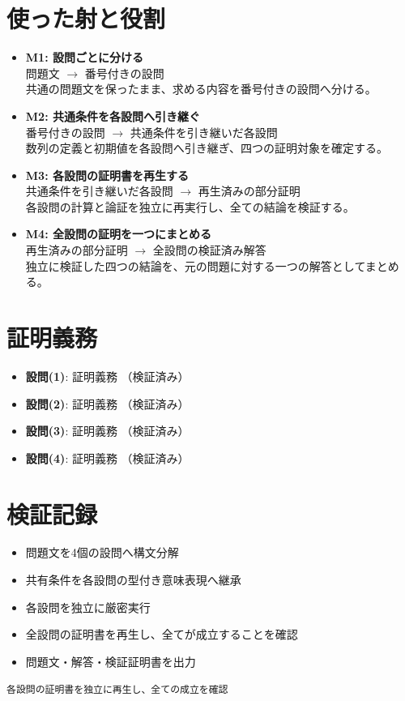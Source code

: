 \documentclass[uplatex,dvipdfmx,11pt]{jsarticle}
\begin{document}
\clearpage
\section*{使った射と役割}
\begin{itemize}
\item \textbf{M1: 設問ごとに分ける}\\
問題文
$\longrightarrow$
番号付きの設問\\
共通の問題文を保ったまま、求める内容を番号付きの設問へ分ける。
\item \textbf{M2: 共通条件を各設問へ引き継ぐ}\\
番号付きの設問
$\longrightarrow$
共通条件を引き継いだ各設問\\
数列の定義と初期値を各設問へ引き継ぎ、四つの証明対象を確定する。
\item \textbf{M3: 各設問の証明書を再生する}\\
共通条件を引き継いだ各設問
$\longrightarrow$
再生済みの部分証明\\
各設問の計算と論証を独立に再実行し、全ての結論を検証する。
\item \textbf{M4: 全設問の証明を一つにまとめる}\\
再生済みの部分証明
$\longrightarrow$
全設問の検証済み解答\\
独立に検証した四つの結論を、元の問題に対する一つの解答としてまとめる。
\end{itemize}


\section*{証明義務}
\begin{itemize}
\item \textbf{設問(1)}: 証明義務 （検証済み）
\item \textbf{設問(2)}: 証明義務 （検証済み）
\item \textbf{設問(3)}: 証明義務 （検証済み）
\item \textbf{設問(4)}: 証明義務 （検証済み）
\end{itemize}


\section*{検証記録}
\begin{itemize}
\item 問題文を4個の設問へ構文分解
\item 共有条件を各設問の型付き意味表現へ継承
\item 各設問を独立に厳密実行
\item 全設問の証明書を再生し、全てが成立することを確認
\item 問題文・解答・検証証明書を出力
\end{itemize}
\noindent\texttt{各設問の証明書を独立に再生し、全ての成立を確認}
\par{}
\end{document}
